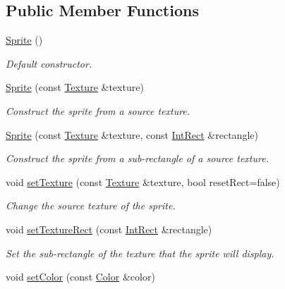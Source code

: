 \subsection*{Public Member Functions}
\begin{DoxyCompactItemize}
\item 
\mbox{\hyperlink{classsf_1_1_sprite_a92559fbca895a96758abf5eabab96984}{Sprite}} ()
\begin{DoxyCompactList}\small\item\em Default constructor. \end{DoxyCompactList}\item 
\mbox{\hyperlink{classsf_1_1_sprite_a2a9fca374d7abf084bb1c143a879ff4a}{Sprite}} (const \mbox{\hyperlink{classsf_1_1_texture}{Texture}} \&texture)
\begin{DoxyCompactList}\small\item\em Construct the sprite from a source texture. \end{DoxyCompactList}\item 
\mbox{\hyperlink{classsf_1_1_sprite_a01cfe1402372d243dbaa2ffa96020206}{Sprite}} (const \mbox{\hyperlink{classsf_1_1_texture}{Texture}} \&texture, const \mbox{\hyperlink{classsf_1_1_rect}{Int\+Rect}} \&rectangle)
\begin{DoxyCompactList}\small\item\em Construct the sprite from a sub-\/rectangle of a source texture. \end{DoxyCompactList}\item 
void \mbox{\hyperlink{classsf_1_1_sprite_a3729c88d88ac38c19317c18e87242560}{set\+Texture}} (const \mbox{\hyperlink{classsf_1_1_texture}{Texture}} \&texture, bool reset\+Rect=false)
\begin{DoxyCompactList}\small\item\em Change the source texture of the sprite. \end{DoxyCompactList}\item 
void \mbox{\hyperlink{classsf_1_1_sprite_a3fefec419a4e6a90c0fd54c793d82ec2}{set\+Texture\+Rect}} (const \mbox{\hyperlink{classsf_1_1_rect}{Int\+Rect}} \&rectangle)
\begin{DoxyCompactList}\small\item\em Set the sub-\/rectangle of the texture that the sprite will display. \end{DoxyCompactList}\item 
void \mbox{\hyperlink{classsf_1_1_sprite_a14def44da6437bfea20c4df5e71aba4c}{set\+Color}} (const \mbox{\hyperlink{classsf_1_1_color}{Color}} \&color)

\end{DoxyCompactItemize}
